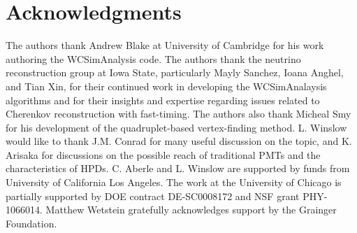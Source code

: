 \documentclass[aps,prc,twocolumn,groupedaddress,showpacs,amsmath,amssymb,floatfix,superscriptaddress]{revtex4}
\begin{document}
\section{Acknowledgments}
The authors thank Andrew Blake at University of Cambridge for his work
authoring the WCSimAnalysis code. The authors thank the neutrino
reconstruction group at Iowa State, particularly Mayly Sanchez, Ioana
Anghel, and Tian Xin, for their continued work in developing the
WCSimAnalaysis algorithms and for their insights and expertise
regarding issues related to Cherenkov reconstruction with
fast-timing. The authors also thank Micheal Smy for his development of
the quadruplet-based vertex-finding method. L. Winslow would like to
thank J.M. Conrad for many useful discussion on the topic, and
K. Arisaka for discussions on the possible reach of traditional PMTs
and the characteristics of HPDs. C. Aberle and L. Winslow are
supported by funds from University of California Los Angeles. The work
at the University of Chicago is partially supported by DOE
contract DE-SC0008172 and NSF grant PHY-1066014. Matthew Wetstein gratefully
acknowledges support by the Grainger Foundation.

 
\end{document}
